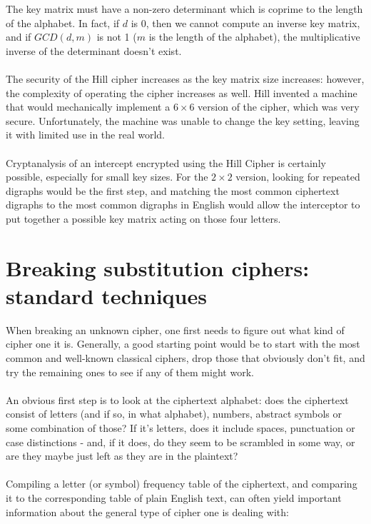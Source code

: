 \documentclass[Lau,binding=0.6cm,oneside]{sapthesis}
\begin{document}
The key matrix must have a non-zero determinant which is coprime to the length of the alphabet. In fact, if $d$ is 0, then we cannot compute an inverse key matrix, and if $GCD(d, m)$ is not 1 ($m$ is the length of the alphabet), the multiplicative inverse of the determinant doesn't exist.\\\\
The security of the Hill cipher increases as the key matrix size increases: however, the complexity of operating the cipher increases as well. Hill invented a machine that would mechanically implement a $6 \times 6$ version of the cipher, which was very secure. Unfortunately, the machine was unable to change the key setting, leaving it with limited use in the real world.\\\\
Cryptanalysis of an intercept encrypted using the Hill Cipher is certainly possible, especially for small key sizes. For the $2 \times 2$ version, looking for repeated digraphs would be the first step, and matching the most common ciphertext digraphs to the most common digraphs in English would allow the interceptor to put together a possible key matrix acting on those four letters.

\chapter{Breaking substitution ciphers: standard techniques}
When breaking an unknown cipher, one first needs to figure out what kind of cipher one it is. Generally, a good starting point would be to start with the most common and well-known classical ciphers, drop those that obviously don't fit, and try the remaining ones to see if any of them might work.\\\\
An obvious first step is to look at the ciphertext alphabet: does the ciphertext consist of letters (and if so, in what alphabet), numbers, abstract symbols or some combination of those? If it's letters, does it include spaces, punctuation or case distinctions - and, if it does, do they seem to be scrambled in some way, or are they maybe just left as they are in the plaintext?\\\\
Compiling a letter (or symbol) frequency table of the ciphertext, and comparing it to the corresponding table of plain English text, can often yield important information about the general type of cipher one is dealing with:
\end{document}
